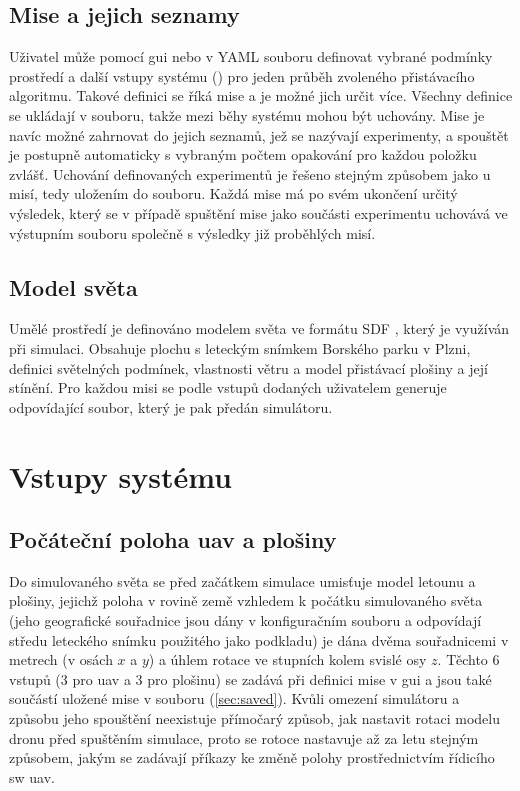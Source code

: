     \subsection{Mise a jejich seznamy}
      Uživatel může pomocí \acrshort{gui} nebo v YAML souboru definovat vybrané podmínky prostředí a další vstupy systému () pro jeden průběh zvoleného přistávacího algoritmu. Takové definici se říká mise a je možné jich určit více. Všechny definice se ukládají v souboru, takže mezi běhy systému mohou být uchovány. Mise je navíc možné zahrnovat do jejich seznamů, jež se nazývají experimenty, a spouštět je postupně automaticky s vybraným počtem opakování pro každou položku zvlášť. Uchování definovaných experimentů je řešeno stejným způsobem jako u misí, tedy uložením do souboru. Každá mise má po svém ukončení určitý výsledek, který se v případě spuštění mise jako součásti experimentu uchovává ve výstupním souboru společně s výsledky již proběhlých misí.
    \subsection{Model světa}
      Umělé prostředí je definováno modelem světa ve formátu SDF \cite{sdf}, který je využíván při simulaci. Obsahuje plochu s leteckým snímkem Borského parku v Plzni, definici světelných podmínek, vlastnosti větru a model přistávací plošiny a její stínění. Pro každou misi se podle vstupů dodaných uživatelem generuje odpovídající soubor, který je pak předán simulátoru.

  \section{Vstupy systému} \label{sec:inputs}
    \subsection{Počáteční poloha \acrshort{uav} a plošiny}
      Do simulovaného světa se před začátkem simulace umisťuje model letounu a plošiny, jejichž poloha v rovině země vzhledem k počátku simulovaného světa (jeho geografické souřadnice jsou dány v konfiguračním souboru a odpovídají středu leteckého snímku použitého jako podkladu) je dána dvěma souřadnicemi v metrech (v osách $x$ a $y$) a úhlem rotace ve stupních kolem svislé osy $z$. Těchto 6 vstupů (3 pro \acrshort{uav} a 3 pro plošinu) se zadává při definici mise v \acrshort{gui} a jsou také součástí uložené mise v souboru (\cref{sec:saved}). Kvůli omezení simulátoru a způsobu jeho spouštění neexistuje přímočarý způsob, jak nastavit rotaci modelu dronu před spuštěním simulace, proto se rotoce nastavuje až za letu stejným způsobem, jakým se zadávají příkazy ke změně polohy prostřednictvím řídicího \acrshort{sw} \acrshort{uav}.
